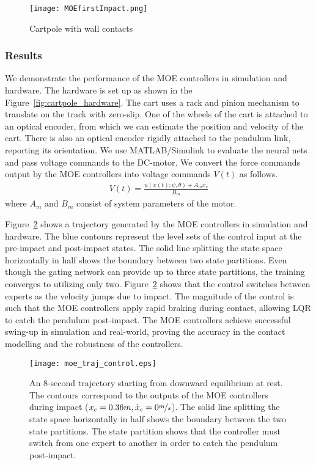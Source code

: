 \begin{figure}[H]
    \centering
    \texttt{[image: MOEfirstImpact.png]}
    \caption{Cartpole with wall contacts}
    \label{fig:cartpole_contact}
\end{figure}

\subsubsection{Results}

We demonstrate the performance of the MOE controllers in simulation and hardware. 
%
The hardware is set up as shown in the Figure~\ref{fig:cartpole_hardware}.
% 
The cart uses a rack and pinion mechanism to translate on the track with zero-slip.
%
One of the wheels of the cart is attached to an optical encoder, from which we
can estimate the position and velocity of the cart.
%
There is also an optical encoder rigidly attached to the pendulum link,
reporting its orientation. 
%
%
We use MATLAB/Simulink to evaluate the neural nets and pass voltage commands to
the DC-motor.
%
We convert the force commands output by the MOE controllers into voltage
commands $V(t)$ as follows.
\begin{align*}
    V(t) = \frac{u(x(t); \psi, \theta) + A_m \dot{x}_c}{B_m}
\end{align*} 
\noindent where $A_m$ and $B_m$ consist of system parameters of the motor.

Figure~\ref{fig:cartpole_trajectory} shows a trajectory generated by the MOE
controllers in simulation and hardware.
%
The blue contours represent the level sets of the control input at the
pre-impact and post-impact states.
%
The solid line splitting the state space horizontally in half shows the boundary
between two state partitions.
%
Even though the gating network can provide up to three state partitions, the
training converges to utilizing only two.
%
Figure~\ref{fig:cartpole_trajectory} shows that the control switches between
experts as the velocity jumps due to impact.
%
The magnitude of the control is such that the MOE controllers apply rapid
braking during contact, allowing LQR to catch the pendulum post-impact.
%
The MOE controllers achieve successful swing-up in simulation and real-world,
proving the accuracy in the contact modelling and the robustness of the
controllers.


\begin{figure}[H]
    \centering
    \texttt{[image: moe\_traj\_control.eps]}
    \caption{An 8-second trajectory starting from downward equilibrium at rest.
    The contours correspond to the outputs of the MOE controllers during impact
    ($x_c=0.36m, \dot{x}_c = 0\nicefrac{m}{s}$). The solid line
    splitting the state space horizontally in half shows the boundary between
    the two state partitions. The state partition shows that the controller must
    switch from one expert to another in order to catch the pendulum
    post-impact.}
    \label{fig:cartpole_trajectory}
\end{figure}

